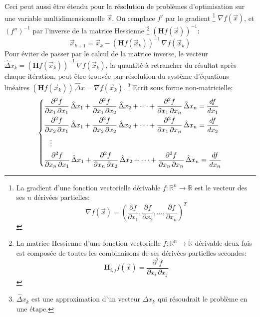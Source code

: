 \documentclass[a4paper,10pt]{scrreprt}
\begin{document}
Ceci peut aussi être étendu pour la résolution de problèmes d'optimisation sur une variable multidimensionnelle $\vec{x}$. On remplace $f'$ par le gradient
\footnote{La gradient d'une fonction vectorielle dérivable $f : \mathbb{R}^n \rightarrow \mathbb{R}$ est le vecteur des ses $n$ dérivées partielles: $$\nabla f(\vec{x}) = \left( \frac{\partial f}{\partial x_1}, \frac{\partial f}{\partial x_2}, \ldots, \frac{\partial f}{\partial x_n} \right)^T$$}
$\nabla f(\vec{x})$, et $(f'')^{-1}$ par l'inverse de la matrice Hessienne
\footnote{La matrice Hessienne d'une fonction vectorielle $f : \mathbb{R}^n \rightarrow \mathbb{R}$ dérivable deux fois est composée de toutes les combinaisons de ses dérivées partielles secondes: $$\mathbf{H}_{i,j} f(\vec{x}) = \frac{\partial^2 f}{\partial x_i \, \partial x_j}$$}
$( \mathbf{H} f(\vec{x}) )^{-1}$:
\begin{equation}
	\vec{x}_{k+1} = \vec{x}_{k} - (\mathbf{H} f(\vec{x}_k))^{-1} \, \nabla f(\vec{x}_k)
\end{equation}
Pour éviter de passer par le calcul de la matrice inverse, le vecteur $\hat{\Delta} x_k = (\mathbf{H} f(\vec{x}_k))^{-1} \, \nabla f(\vec{x}_k)$, la quantité à retrancher du résultat après chaque itération, peut être trouvée par résolution du système d'équations linéaires $(\mathbf{H} f(\vec{x}_k)) \, \hat{\Delta} x = \nabla f(\vec{x}_k)$.
\footnote{$\hat{\Delta} x_k$ est une approximation d'un vecteur $\Delta x_k$ qui résoudrait le problème en une étape.}
Ecrit sous forme non-matricielle:
\begin{equation}
\begin{dcases}
	\frac{\partial^2 f}{\partial x_1 \, \partial x_1} \, \hat{\Delta} x_1 + \frac{\partial^2 f}{\partial x_1 \, \partial x_2} \, \hat{\Delta} x_2 + \dotsb + \frac{\partial^2 f}{\partial x_1 \, \partial x_n} \, \hat{\Delta} x_n = \frac{d f}{d x_1} \\
	\frac{\partial^2 f}{\partial x_2 \, \partial x_1} \, \hat{\Delta} x_1 + \frac{\partial^2 f}{\partial x_2 \, \partial x_2} \, \hat{\Delta} x_2 + \dotsb + \frac{\partial^2 f}{\partial x_1 \, \partial x_n} \, \hat{\Delta} x_n = \frac{d f}{d x_2} \\
	\hspace{3mm} \vdots \\
	\frac{\partial^2 f}{\partial x_n \, \partial x_1} \, \hat{\Delta} x_1 + \frac{\partial^2 f}{\partial x_n \, \partial x_2} \, \hat{\Delta} x_2 + \dotsb + \frac{\partial^2 f}{\partial x_n \, \partial x_n} \, \hat{\Delta} x_n = \frac{d f}{d x_n} \\
\end{dcases}
\end{equation}
\end{document}
